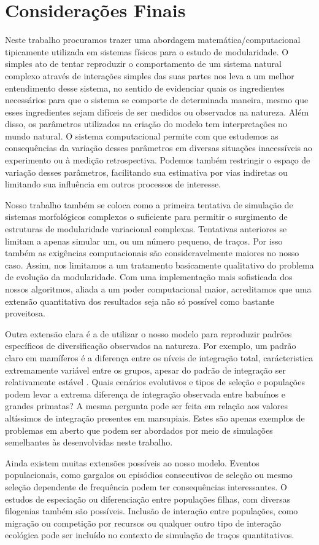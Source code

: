\pagestyle{empty}
\cleardoublepage
\pagestyle{fancy}
\chapter{Considerações Finais}
\label{cap5}

Neste trabalho procuramos trazer uma abordagem matemática/computacional
tipicamente utilizada em sistemas físicos para o estudo de
modularidade. 
O simples ato de tentar reproduzir o comportamento de um sistema natural
complexo através de interações simples das suas partes nos leva a um melhor
entendimento desse sistema, no sentido de evidenciar quais os
ingredientes necessários para que o sistema se comporte de determinada
maneira, mesmo que esses ingredientes sejam difíceis de ser medidos ou
observados na natureza. 
Além disso, os parâmetros utilizados na criação do modelo tem
interpretações no mundo natural. 
O sistema computacional permite com que estudemos as consequências da
variação desses parâmetros em diversas situações inacessíveis ao
experimento ou à medição retrospectiva. 
Podemos também restringir o espaço de variação desses parâmetros,
facilitando sua estimativa por vias indiretas ou limitando sua
influência em outros processos de interesse. 

Nosso trabalho também se coloca como a primeira tentativa de simulação
de sistemas morfológicos complexos o suficiente para permitir o
surgimento de estruturas de modularidade variacional complexas. 
Tentativas anteriores se limitam a apenas simular um, ou um número
pequeno, de traços. 
Por isso também as exigências computacionais são consideravelmente
maiores no nosso caso. Assim, nos limitamos a um tratamento basicamente
qualitativo do problema de evolução da modularidade. 
Com uma implementação mais sofisticada dos nossos algoritmos, aliada a
um poder computacional maior, acreditamos que uma extensão quantitativa
dos resultados seja não só possível como bastante proveitosa. 

Outra extensão clara é a de utilizar o nosso modelo para reproduzir
padrões específicos de diversificação observados na natureza. 
Por exemplo, um padrão claro em mamíferos é a diferença entre os níveis
de integração total, carácteristica extremamente variável entre os
grupos, apesar do padrão de integração ser relativamente estável
\cite{Porto2008}. 
Quais cenários evolutivos e tipos de seleção e populações podem levar a
extrema diferença de integração observada entre babuínos e grandes
primatas?
A mesma pergunta pode ser feita em relação aos valores altíssimos de
integração presentes em marsupiais. 
Estes são apenas exemplos de problemas em aberto que podem ser abordados
por meio de simulações semelhantes às desenvolvidas neste trabalho. 

Ainda existem muitas extensões possíveis ao nosso modelo. 
Eventos populacionais, como gargalos ou episódios consecutivos de
seleção ou mesmo seleção dependente de frequência podem ter
consequências interessantes. 
O estudos de especiação ou diferenciação entre populações filhas, com
diversas filogenias também são possíveis. 
Inclusão de interação entre populações, como migração ou competição por
recursos ou qualquer outro tipo de interação ecológica pode ser incluído
no contexto de simulação de traços quantitativos. 
